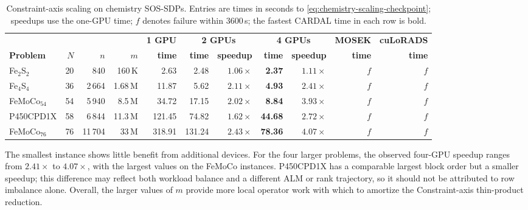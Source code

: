 \documentclass[11pt]{article}
\theoremstyle{definition}
\theoremstyle{remark}
\newcommand{\name}{\textsc{CARDAL}\xspace}
\begin{document}
\begin{table}[htbp]
\centering
\caption{Constraint-axis scaling on chemistry SOS-SDPs.  Entries are times in
seconds to \eqref{eq:chemistry-scaling-checkpoint}; speedups use the one-GPU
time; $f$ denotes failure within $3600$\,s; the fastest \name{} time in each
row is bold.}
\label{tab:rowwise}
{\setlength{\tabcolsep}{4pt}
\begin{tabular}{lrrrrrrrrrr}
\toprule
& & & &
  \textbf{1 GPU} & \multicolumn{2}{c}{\textbf{2 GPUs}}
  & \multicolumn{2}{c}{\textbf{4 GPUs}}
  & \textbf{MOSEK} & \textbf{cuLoRADS}\\
\cmidrule(lr){5-5}\cmidrule(lr){6-7}\cmidrule(lr){8-9}
\cmidrule(lr){10-10}\cmidrule(lr){11-11}
\textbf{Problem} & \textbf{$N$} & \textbf{$n$} & \textbf{$m$}
& \textbf{time} & \textbf{time} & \textbf{speedup}
& \textbf{time} & \textbf{speedup} & \textbf{time} & \textbf{time}\\
\midrule
Fe$_{2}$S$_{2}$ & 20 & 840     & 160\,K  & 2.63   & 2.48   & $1.06\times$ & \textbf{2.37}  & $1.11\times$ & $f$ & $f$\\
Fe$_{4}$S$_{4}$ & 36 & 2\,664  & 1.68\,M & 11.87  & 5.62   & $2.11\times$ & \textbf{4.93}  & $2.41\times$ & $f$ & $f$\\
FeMoCo$_{54}$   & 54 & 5\,940  & 8.5\,M  & 34.72  & 17.15  & $2.02\times$ & \textbf{8.84}  & $3.93\times$ & $f$ & $f$\\
P450CPD1X       & 58 & 6\,844  & 11.3\,M & 121.45 & 74.82  & $1.62\times$ & \textbf{44.68} & $2.72\times$ & $f$ & $f$\\
FeMoCo$_{76}$   & 76 & 11\,704 & 33\,M   & 318.91 & 131.24 & $2.43\times$ & \textbf{78.36} & $4.07\times$ & $f$ & $f$\\
\bottomrule
\end{tabular}
}
\end{table}

The smallest instance shows little benefit from additional devices.  For the
four larger problems, the observed four-GPU speedup ranges from $2.41\times$
to $4.07\times$, with the largest values on the FeMoCo instances.  P450CPD1X
has a comparable largest block order but a smaller speedup; this difference
may reflect both workload balance and a different ALM or rank trajectory, so
it should not be attributed to row imbalance alone.  Overall, the larger
values of $m$ provide more local operator work with which to amortize the
Constraint-axis thin-product reduction.

\end{document}
